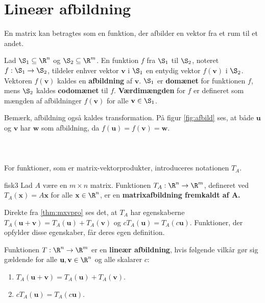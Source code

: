 \section{Lineær afbildning}
%
En matrix kan betragtes som en funktion, der afbilder en vektor fra et rum til et andet.
%
\begin{defn}{}{}
Lad $\S _1 \subseteq \R^n$ og $\S _2 \subseteq \R^m$.
En funktion $f$ fra $\S_1$ til $\S_2$, noteret $f:\S_1\rightarrow\S_2$, tildeler enhver vektor $\textbf{v}$ i $\S_1$ en entydig vektor $f(\textbf{v})$ i $\S_2$.
Vektoren $f(\textbf{v})$ kaldes en \textbf{afbildning} af $\textbf{v}$.
$\S_1$ er \textbf{domænet} for funktionen $f$, mens $\S_2$ kaldes \textbf{codomænet} til $f$.
\textbf{Værdimængden} for $f$ er defineret som mængden af afbildninger $f(\textbf{v})$ for alle $\textbf{v}\in \S_1$.
\end{defn}\noindent
%
Bemærk, afbildning også kaldes transformation.
På figur \ref{fig:afbild} ses, at både $\textbf{u}$ og $\textbf{v}$ har $\textbf{w}$ som afbildning, da $f(\textbf{u})=f(\textbf{v})=\textbf{w}$. \\\\
%
%

%
\\\\
For funktioner, som er matrix-vektorprodukter, introduceres notationen $T_A$.
%
\begin{defn}{}{fisk3}
Lad $A$ være en $m \times n$ matrix.
Funktionen $T_A:\R^n \rightarrow \R^m$, defineret ved $T_A(\textbf{x}) = A\textbf{x}$ for alle $\textbf{x} \in \R^n$, er en \textbf{matrixafbildning fremkaldt af $\mathbf{A}$.}
\end{defn}\noindent
%
Direkte fra  \ref{thm:mxvpro} ses det, at $T_A$ har egenskaberne $T_A(\textbf{u}+\textbf{v})=T_A(\textbf{u}) + T_A(\textbf{v})$ og $cT_A(\textbf{u}) = T_A(c\textbf{u})$.
Funktioner, der opfylder disse egenskaber, får deres egen definition.
%
\begin{defn}{}{}
Funktionen $T: \R^n \rightarrow \R^m$ er en \textbf{lineær afbildning}, hvis følgende vilkår gør sig gældende for alle $\textbf{u},\textbf{v} \in \R^n$ og alle skalarer $c$:
\begin{enumerate}[label=(\alph*)]
\item $T_A(\textbf{u}+\textbf{v})=T_A(\textbf{u}) + T_A(\textbf{v})$.
\item $cT_A(\textbf{u}) = T_A(c\textbf{u})$.
\end{enumerate}
\end{defn}
